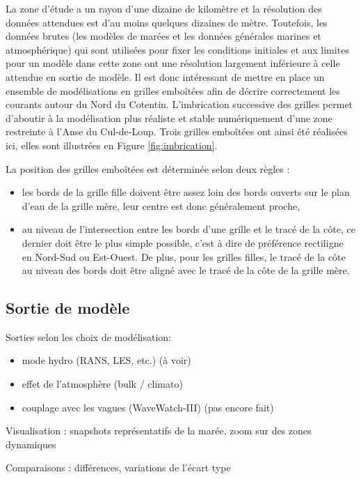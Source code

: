 \documentclass[10pt,a4paper,titlepage]{article}
\begin{document}
La zone d'étude a un rayon d'une dizaine de kilomètre et la résolution des données attendues est d'au moins quelques dizaines de mètre.
Toutefois, les données brutes (les modèles de marées et les données générales marines et atmosphérique) qui sont utilisées pour fixer les conditions initiales et aux limites pour un modèle dans cette zone ont une résolution largement inférieure à celle attendue en sortie de modèle.
Il est donc intéressant de mettre en place un ensemble de modélisations en grilles emboîtées afin de décrire correctement les courants autour du Nord du Cotentin.
L'imbrication successive des grilles permet d'aboutir à la modélisation plus réaliste et stable numériquement d'une zone restreinte à l'Anse du Cul-de-Loup.
Trois grilles emboîtées ont ainsi été réalisées ici, elles sont illustrées en Figure \ref{fig:imbrication}.


La position des grilles emboîtées est déterminée selon deux règles :
\begin{itemize}
    \item les bords de la grille fille doivent être assez loin des bords ouverts sur le plan d'eau de la grille mère, leur centre est donc généralement proche,
    \item au niveau de l'intersection entre les bords d'une grille et le tracé de la côte, ce dernier doit être le plus simple possible, c'est à dire de préférence rectiligne en Nord-Sud ou Est-Ouest.
    De plus, pour les grilles filles, le tracé de la côte au niveau des bords doit être aligné avec le tracé de la côte de la grille mère.
\end{itemize}

\subsection{Sortie de modèle}
\label{sub:sortie_modele}
Sorties selon les choix de modélisation:
\begin{itemize}
    \item mode hydro (RANS, LES, etc.) (à voir)
    \item effet de l'atmosphère (bulk / climato)
    \item couplage avec les vagues (WaveWatch-III) (pas encore fait)
\end{itemize}

Visualisation : snapshots représentatifs de la marée, zoom sur des zones dynamiques

Comparaisons : différences, variations de l'écart type
\end{document}
